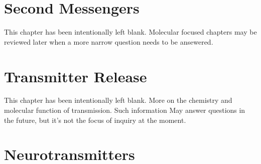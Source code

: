 \documentclass[12pt,a4paper]{article}
\begin{document}



\clearpage
\section{Second Messengers}
\begin{center}
    This chapter has been intentionally left blank. Molecular focused chapters may be reviewed later when a more narrow question needs to be ansewered. 
\end{center}

\clearpage
\section{Transmitter Release}
\begin{center}
    This chapter has been intentionally left blank. More on the chemistry and molecular function of transmission. Such information May answer questions in the future, but it's not the focus of inquiry at the moment. 
\end{center}

\clearpage
\section{Neurotransmitters}
\end{document}
